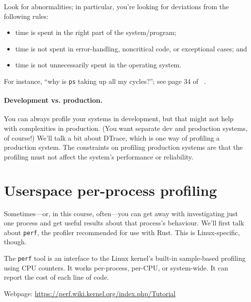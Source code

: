 \documentclass[a4paper]{report}
\begin{document}
Look for abnormalities; in particular, you're looking for
deviations from the following rules:
\begin{itemize}[noitemsep]
\item time is spent in the right part of the system/program;
\item time is not spent in error-handling, noncritical code, or exceptional cases; and
\item time is not unnecessarily spent in the operating system.
\end{itemize}
For instance, ``why is {\tt ps} taking up all my cycles?'';
see page 34 of ~\cite{300ps}.

\paragraph{Development vs. production.}
You can always profile your systems in development, but that might not
help with complexities in production. (You want separate dev and
production systems, of course!) We'll talk a bit about DTrace, which
is one way of profiling a production system. The constraints on profiling 
production systems are that the profiling must not affect the system's
performance or reliability.

\section*{Userspace per-process profiling}
Sometimes---or, in this course, often---you can get away with
investigating just one process and get useful results about that
process's behaviour.  We'll first talk about {\tt perf}, the profiler 
recommended for use with Rust. This is Linux-specific, though.

The \texttt{perf} tool is an interface to the Linux kernel's built-in
sample-based profiling using CPU counters. It works per-process, per-CPU, or system-wide. It can report the cost of each line of code.

Webpage: \url{https://perf.wiki.kernel.org/index.php/Tutorial}
\end{document}
